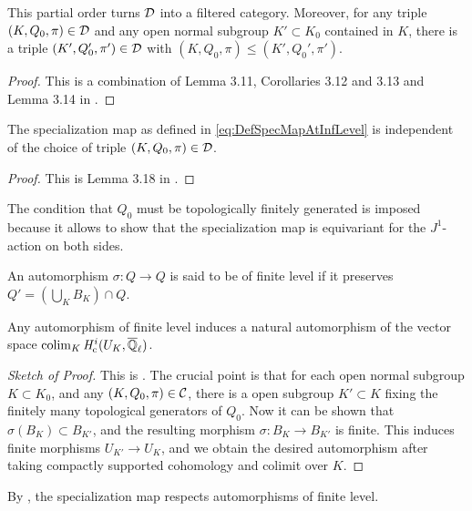 \documentclass[../main.tex]{subfiles}
\begin{document}
\begin{lem}\label{lem:MiedaCategoryOfChoicesIsFiltered}
  This partial order turns $\mathcal{D}$ into a filtered category. Moreover, for any
  triple $(K, Q_0, \pi) \in \mathcal{D}$ and any open normal subgroup $K' \subset K_0$ 
  contained in $K$, there is a triple $(K', Q_0', \pi') \in \mathcal{D}$ with $(K, Q_0,
  \pi) \leq (K', Q_0', \pi')$. 
\begin{proof}
  This is a combination of Lemma 3.11, Corollaries 3.12 and 3.13 and 
  Lemma 3.14 in \cite{mieda2016geometric}.
\end{proof}
\end{lem}

\begin{lem}\label{lem:specmapisindependentofchoice}
  The specialization map as defined in \eqref{eq:DefSpecMapAtInfLevel} is
  independent of the choice of triple $(K, Q_0, \pi) \in \mathcal{D}$. 
  \begin{proof}
    This is Lemma 3.18 in \cite{mieda2016geometric}.
  \end{proof}
\end{lem}

The condition that $Q_0$ must be topologically finitely generated is imposed 
because it allows to show that the specialization map is equivariant for the 
$J^1$-action on both sides. 

\begin{defi}\label{def:MorphismOfFinLevel}
  An automorphism $\sigma\colon Q \to Q$ is said to be of finite level if it 
  preserves $Q' = (\bigcup_K B_K)\cap Q$. 
\end{defi}

\begin{lem}\label{lem:FinLevelAutoYIeldAutOfColim}
  Any automorphism of finite level
  induces a natural automorphism of the vector space $\operatorname*{colim}_K \mathit H_{\mathrm{c}}^i(U_K, {\overline {\mathbb{Q}}_\ell})$.
  \begin{proof}[Sketch of Proof] 
    This is \cite[Lemma 3.20]{mieda2016geometric}.  The crucial point 
    is that for each open normal subgroup $K \subset K_0$, and any 
    $(K, Q_0, \pi) \in \mathcal{C}$, there is a open subgroup $K' \subset K$ fixing the 
    finitely many topological generators of $Q_0$. Now it can be shown that 
    $\sigma(B_K) \subset B_{K'}$, and the resulting morphism
    $\sigma\colon B_K \to B_{K'}$ is finite. This induces finite morphisms
    $U_{K'} \to U_K$, and we obtain the desired automorphism after taking 
    compactly supported cohomology and colimit over $K$. 
\end{proof}
\end{lem}
By \cite[Proposition 3.21]{mieda2016geometric}, the specialization map respects
automorphisms of finite level.
\end{document}
